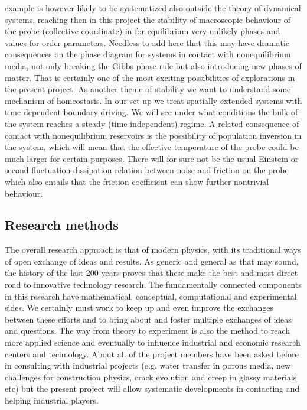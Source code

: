example is however likely to be systematized also outside the theory of dynamical systems,
reaching then in this project the stability of macroscopic behaviour of the probe
(collective coordinate) in for equilibrium very unlikely phases and values for order
parameters.  Needless to add here that this may have dramatic consequences on the phase
diagram for systems in contact with nonequilibrium media, not only breaking the Gibbs phase
rule but also introducing new phases of matter.  That is certainly one of the most exciting
possibilities of explorations in the present project. As another theme of stability we want
to understand some mechanism of homeostasis. In our set-up we treat spatially extended
systems with time-dependent boundary driving. We will see under what conditions the bulk of
the system reaches a steady (time-independent) regime. A related consequence of contact with
nonequilibrium reservoirs is the possibility of population inversion in the system, which
will mean that the effective temperature of the probe could be much larger for certain
purposes.  There will for sure not be the usual Einstein or second fluctuation-dissipation
relation between noise and friction on the probe which also entails that the friction
coefficient can show further nontrivial behaviour.  


\subsection{Research methods}\label{sec:methods}

The overall research approach is that of modern physics, with its traditional ways of open
exchange of ideas and results.  As generic and general as that may sound, the history of the
last 200 years proves that these make the best and most direct road to innovative technology
research.  The fundamentally connected components in this research have mathematical,
conceptual, computational and experimental sides.
%
We certainly must work to keep up and even improve the exchanges between these efforts and
to bring about and foster multiple exchanges of ideas and questions.  The way from theory to
experiment is also the method to reach more applied science and eventually to influence
industrial and economic research centers and technology.  About all of the project members
have been asked before in consulting with industrial projects (e.g. water transfer in porous
media, new challenges for construction physics, crack evolution and creep in glassy
materials etc) but the present project will allow systematic developments in contacting and
helping industrial players.


